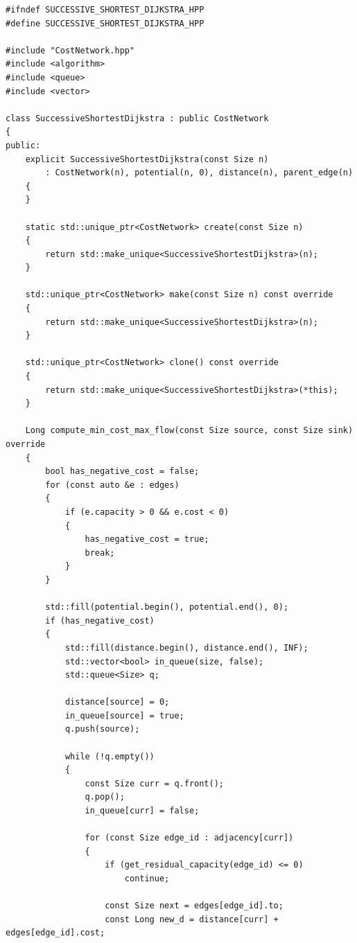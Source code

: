 \newpage
\label{ap:successive_shortest_dijkstra}

\begin{lstlisting}[caption={Implementação em C++ do algoritmo \textit{Successive Shortest Path} com Potenciais Nodais e Dijkstra.}, label={lst:successive_shortest_dijkstra}]
#ifndef SUCCESSIVE_SHORTEST_DIJKSTRA_HPP
#define SUCCESSIVE_SHORTEST_DIJKSTRA_HPP

#include "CostNetwork.hpp"
#include <algorithm>
#include <queue>
#include <vector>

class SuccessiveShortestDijkstra : public CostNetwork
{
public:
	explicit SuccessiveShortestDijkstra(const Size n)
	    : CostNetwork(n), potential(n, 0), distance(n), parent_edge(n)
	{
	}

	static std::unique_ptr<CostNetwork> create(const Size n)
	{
		return std::make_unique<SuccessiveShortestDijkstra>(n);
	}

	std::unique_ptr<CostNetwork> make(const Size n) const override
	{
		return std::make_unique<SuccessiveShortestDijkstra>(n);
	}

	std::unique_ptr<CostNetwork> clone() const override
	{
		return std::make_unique<SuccessiveShortestDijkstra>(*this);
	}

	Long compute_min_cost_max_flow(const Size source, const Size sink) override
	{
		bool has_negative_cost = false;
		for (const auto &e : edges)
		{
			if (e.capacity > 0 && e.cost < 0)
			{
				has_negative_cost = true;
				break;
			}
		}

		std::fill(potential.begin(), potential.end(), 0);
		if (has_negative_cost)
		{
			std::fill(distance.begin(), distance.end(), INF);
			std::vector<bool> in_queue(size, false);
			std::queue<Size> q;

			distance[source] = 0;
			in_queue[source] = true;
			q.push(source);

			while (!q.empty())
			{
				const Size curr = q.front();
				q.pop();
				in_queue[curr] = false;

				for (const Size edge_id : adjacency[curr])
				{
					if (get_residual_capacity(edge_id) <= 0)
						continue;

					const Size next = edges[edge_id].to;
					const Long new_d = distance[curr] + edges[edge_id].cost;


\end{lstlisting}
